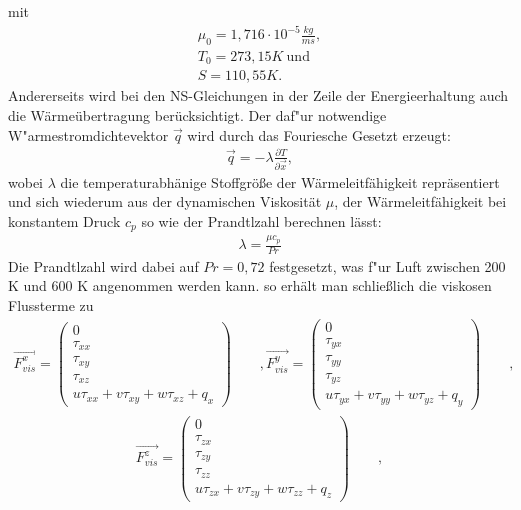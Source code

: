 mit
\begin{gather*}
	\mu_{0}=1,716\cdot10^{-5} \frac{kg}{ms}, \\
	T_{0}=273,15 K  \  \text{und} \\
	S = 110,55K .
\end{gather*}
Andererseits wird bei den NS-Gleichungen in der Zeile der Energieerhaltung auch die Wärmeübertragung berücksichtigt. Der daf"ur notwendige W"armestromdichtevektor $\vec{q}$ wird durch das Fouriesche Gesetzt erzeugt:
\begin{gather}
	\vec{q} = -\lambda \frac{\partial T}{\partial \vec{x}},
\end{gather}
wobei $\lambda$ die temperaturabhänige Stoffgröße der Wärmeleitfähigkeit repräsentiert und sich wiederum aus der dynamischen Viskosität $\mu$, der Wärmeleitfähigkeit bei konstantem Druck $c_{p}$ so wie der Prandtlzahl berechnen lässt:
\begin{gather}
	\lambda = \frac{\mu c_{p}}{Pr}
\end{gather}
Die Prandtlzahl wird dabei auf $Pr = 0,72$ festgesetzt, was f"ur Luft zwischen 200 K und 600 K angenommen werden kann.
so erhält man schließlich die viskosen Flussterme zu
\begin{gather*}
	\vec{F_{vis}^{x}}=\left(\begin{array}{c} 0\\ \tau_{xx}\\ \tau_{xy} \\ \tau_{xz} \\ u\tau_{xx}+v\tau_{xy}+w\tau_{xz}+q_{x} \end{array}\right) \qquad , \vec{F_{vis}^{y}}=\left(\begin{array}{c} 0\\ \tau_{yx}\\ \tau_{yy} \\ \tau_{yz} \\ u\tau_{yx}+v\tau_{yy}+w\tau_{yz}+q_{y} \end{array}\right) \qquad ,  
\end{gather*}
\begin{gather}
	\vec{F_{vis}^{z}}=\left(\begin{array}{c} 0\\ \tau_{zx}\\ \tau_{zy} \\ \tau_{zz} \\ u\tau_{zx}+v\tau_{zy}+w\tau_{zz}+q_{z} \end{array}\right) \qquad ,
\end{gather}

